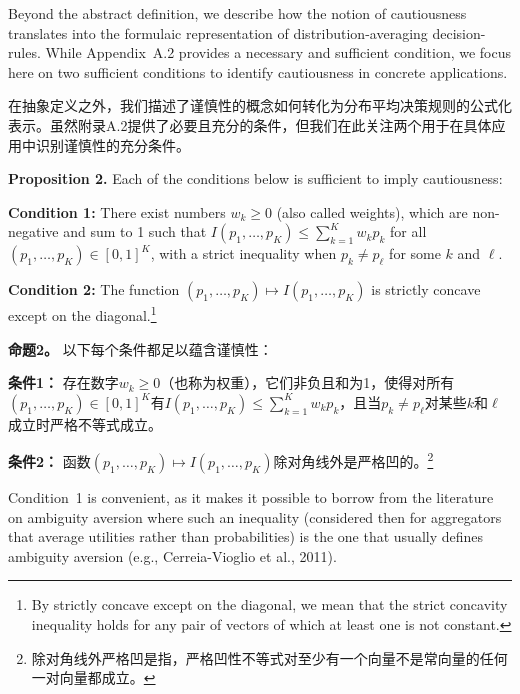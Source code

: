 \documentclass[12pt,a4paper]{article}
\newenvironment{original}
  {\par\noindent\ignorespaces}
  {\par}
\newenvironment{translation}
  {\par\noindent{\color{transblue}\ignorespaces}}
  {\par\medskip}
\begin{document}
\begin{original}
Beyond the abstract definition, we describe how the notion of cautiousness translates into the formulaic representation of distribution-averaging decision-rules. While Appendix~A.2 provides a necessary and sufficient condition, we focus here on two sufficient conditions to identify cautiousness in concrete applications.
\end{original}

\begin{translation}
在抽象定义之外，我们描述了谨慎性的概念如何转化为分布平均决策规则的公式化表示。虽然附录A.2提供了必要且充分的条件，但我们在此关注两个用于在具体应用中识别谨慎性的充分条件。
\end{translation}

\begin{original}
\textbf{Proposition 2.} Each of the conditions below is sufficient to imply cautiousness:

\textbf{Condition 1:} There exist numbers $w_{k} \geq 0$ (also called weights), which are non-negative and sum to 1 such that $I(p_{1}, \dots, p_{K}) \leq \sum_{k=1}^{K} w_{k} p_{k}$ for all $(p_{1}, \dots, p_{K}) \in [0,1]^{K}$, with a strict inequality when $p_{k} \neq p_{\ell}$ for some $k$ and $\ell$.

\textbf{Condition 2:} The function $(p_{1}, \dots, p_{K}) \mapsto I(p_{1}, \dots, p_{K})$ is strictly concave except on the diagonal.\footnote{By strictly concave except on the diagonal, we mean that the strict concavity inequality holds for any pair of vectors of which at least one is not constant.}
\end{original}

\begin{translation}
\textbf{命题2。} 以下每个条件都足以蕴含谨慎性：

\textbf{条件1：} 存在数字$w_{k} \geq 0$（也称为权重），它们非负且和为1，使得对所有$(p_{1}, \dots, p_{K}) \in [0,1]^{K}$有$I(p_{1}, \dots, p_{K}) \leq \sum_{k=1}^{K} w_{k} p_{k}$，且当$p_{k} \neq p_{\ell}$对某些$k$和$\ell$成立时严格不等式成立。

\textbf{条件2：} 函数$(p_{1}, \dots, p_{K}) \mapsto I(p_{1}, \dots, p_{K})$除对角线外是严格凹的。\footnote{除对角线外严格凹是指，严格凹性不等式对至少有一个向量不是常向量的任何一对向量都成立。}
\end{translation}

\begin{original}
Condition~1 is convenient, as it makes it possible to borrow from the literature on ambiguity aversion where such an inequality (considered then for aggregators that average utilities rather than probabilities) is the one that usually defines ambiguity aversion (e.g., Cerreia-Vioglio et al., 2011).
\end{original}
\end{document}
